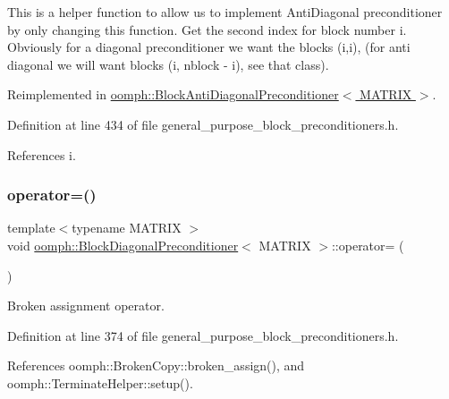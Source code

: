 This is a helper function to allow us to implement Anti\+Diagonal preconditioner by only changing this function. Get the second index for block number i. Obviously for a diagonal preconditioner we want the blocks (i,i), (for anti diagonal we will want blocks (i, nblock -\/ i), see that class). 

Reimplemented in \hyperlink{classoomph_1_1BlockAntiDiagonalPreconditioner_a880a182c7aca041992146d559c109fdb}{oomph\+::\+Block\+Anti\+Diagonal\+Preconditioner$<$ M\+A\+T\+R\+I\+X $>$}.



Definition at line 434 of file general\+\_\+purpose\+\_\+block\+\_\+preconditioners.\+h.



References i.

\mbox{\label{classoomph_1_1BlockDiagonalPreconditioner_a103d94fce9576d964d5213f72c074a60}} 
\subsubsection{\texorpdfstring{operator=()}{operator=()}}
{\footnotesize\ttfamily template$<$typename M\+A\+T\+R\+IX $>$ \\
void \hyperlink{classoomph_1_1BlockDiagonalPreconditioner}{oomph\+::\+Block\+Diagonal\+Preconditioner}$<$ M\+A\+T\+R\+IX $>$\+::operator= (\begin{DoxyParamCaption}\item[{const \hyperlink{classoomph_1_1BlockDiagonalPreconditioner}{Block\+Diagonal\+Preconditioner}$<$ M\+A\+T\+R\+IX $>$ \&}]{ }\end{DoxyParamCaption})\hspace{0.3cm}{\ttfamily [inline]}}



Broken assignment operator. 



Definition at line 374 of file general\+\_\+purpose\+\_\+block\+\_\+preconditioners.\+h.



References oomph\+::\+Broken\+Copy\+::broken\+\_\+assign(), and oomph\+::\+Terminate\+Helper\+::setup().

\mbox{\label{classoomph_1_1BlockDiagonalPreconditioner_a129f0d7877ced9efaa3a7f018618f44b}} 
